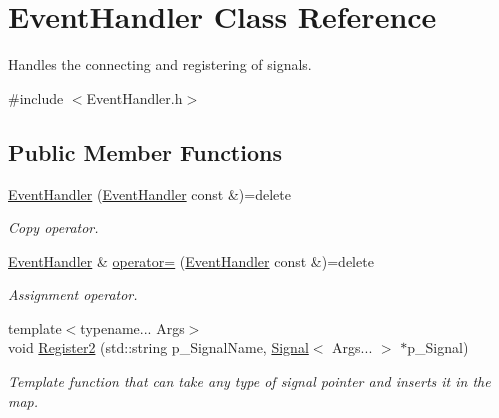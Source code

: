 \hypertarget{class_event_handler}{}\section{Event\+Handler Class Reference}
\label{class_event_handler}


Handles the connecting and registering of signals.  




{\ttfamily \#include $<$Event\+Handler.\+h$>$}

\subsection*{Public Member Functions}
\begin{DoxyCompactItemize}
\item 
\mbox{\label{class_event_handler_a5d7ff24c664f9d1c00a417e9716471cc}} 
\hyperlink{class_event_handler_a5d7ff24c664f9d1c00a417e9716471cc}{Event\+Handler} (\hyperlink{class_event_handler}{Event\+Handler} const \&)=delete
\begin{DoxyCompactList}\small\item\em Copy operator. \end{DoxyCompactList}\item 
\mbox{\label{class_event_handler_acf2df364aed9018b3f1b6c30f2e37654}} 
\hyperlink{class_event_handler}{Event\+Handler} \& \hyperlink{class_event_handler_acf2df364aed9018b3f1b6c30f2e37654}{operator=} (\hyperlink{class_event_handler}{Event\+Handler} const \&)=delete
\begin{DoxyCompactList}\small\item\em Assignment operator. \end{DoxyCompactList}\item 
\mbox{\label{class_event_handler_a6835697a012c284ca8ca9c32f26b8463}} 
{\footnotesize template$<$typename... Args$>$ }\\void \hyperlink{class_event_handler_a6835697a012c284ca8ca9c32f26b8463}{Register2} (std\+::string p\+\_\+\+Signal\+Name, \hyperlink{class_signal}{Signal}$<$ Args... $>$ $\ast$p\+\_\+\+Signal)
\begin{DoxyCompactList}\small\item\em Template function that can take any type of signal pointer and inserts it in the map. \end{DoxyCompactList}\item 

\end{DoxyCompactItemize}
